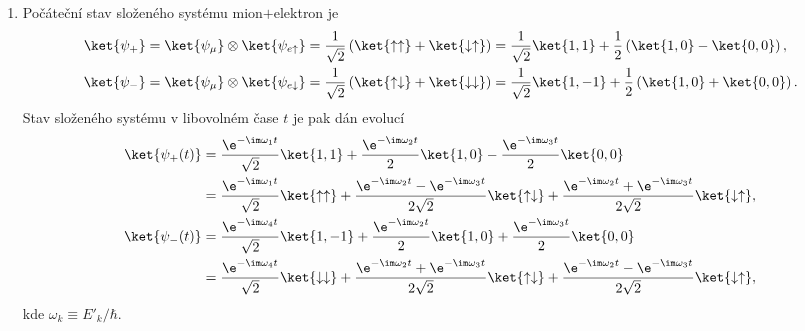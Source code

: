 \begin{solution}
\begin{enumerate}
	\item 
		Počáteční stav složeného systému mion$+$elektron je
		\begin{subequations}
			\begin{align}
				\ket{\psi_{+}}
					&=\ket{\psi_{\mu}}\otimes\ket{\psi_{e\uparrow}}
					 =\frac{1}{\sqrt{2}}\left(\ket{\uparrow\uparrow}+\ket{\downarrow\uparrow}\right)
					 =\frac{1}{\sqrt{2}}\ket{1,1}+\frac{1}{2}\left(\ket{1,0}-\ket{0,0}\right),\\
				\ket{\psi_{-}}
					&=\ket{\psi_{\mu}}\otimes\ket{\psi_{e\downarrow}}
					 =\frac{1}{\sqrt{2}}\left(\ket{\uparrow\downarrow}+\ket{\downarrow\downarrow}\right)			
					 =\frac{1}{\sqrt{2}}\ket{1,-1}+\frac{1}{2}\left(\ket{1,0}+\ket{0,0}\right).
			\end{align}				
		\end{subequations}
		Stav složeného systému v libovolném čase $t$ je pak dán evolucí 
		\begin{subequations}
			\begin{align}
				\ket{\psi_{+}(t)}
					&=\frac{\e^{-\im\omega_{1}t}}{\sqrt{2}}\ket{1,1}+\frac{\e^{-\im\omega_{2}t}}{2}\ket{1,0}
						-\frac{\e^{-\im\omega_{3}t}}{2}\ket{0,0}\nonumber\\
					&=\frac{\e^{-\im\omega_{1}t}}{\sqrt{2}}\ket{\uparrow\uparrow}
						+\frac{\e^{-\im\omega_{2}t}-\e^{-\im\omega_{3}t}}{2\sqrt{2}}\ket{\uparrow\downarrow}
						+\frac{\e^{-\im\omega_{2}t}+\e^{-\im\omega_{3}t}}{2\sqrt{2}}\ket{\downarrow\uparrow},\\
				\ket{\psi_{-}(t)}
					&=\frac{\e^{-\im\omega_{4}t}}{\sqrt{2}}\ket{1,-1}+\frac{\e^{-\im\omega_{2}t}}{2}\ket{1,0}
						+\frac{\e^{-\im\omega_{3}t}}{2}\ket{0,0}\nonumber\\
					&=\frac{\e^{-\im\omega_{4}t}}{\sqrt{2}}\ket{\downarrow\downarrow}
						+\frac{\e^{-\im\omega_{2}t}+\e^{-\im\omega_{3}t}}{2\sqrt{2}}\ket{\uparrow\downarrow}
						+\frac{\e^{-\im\omega_{2}t}-\e^{-\im\omega_{3}t}}{2\sqrt{2}}\ket{\downarrow\uparrow},		
			\end{align}				
		\end{subequations}
		kde $\omega_{k}\equiv E'_{k}/\hbar$.
		

\end{enumerate}
\end{solution}

